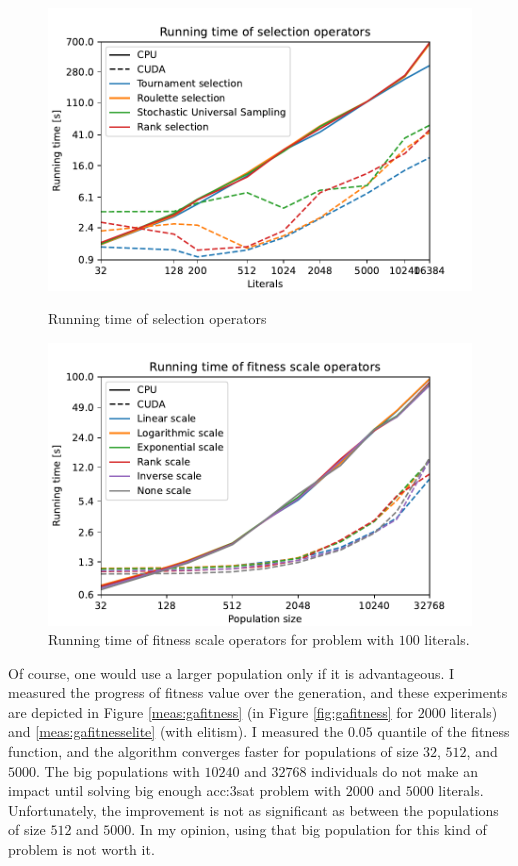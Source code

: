 \begin{figure}
    \begin{minipage}[t]{0.48\textwidth}
        \includegraphics[width=\textwidth]{img/runs/time_ga_selections_with_legend.pdf}
        \caption{Running time of selection operators}
        \label{fig:selectiontime}
    \end{minipage}
    \hfill
    \begin{minipage}[t]{0.48\textwidth}
        \includegraphics[width=\textwidth]{img/runs/time_ga_scale_100l_with_legend.pdf}
        \caption[Running time of fitness scale operators]{Running time of fitness scale operators for problem with $100$ literals.}
        \label{fig:gafitnessscaletime}
    \end{minipage}
\end{figure}


Of course, one would use a larger population only if it is advantageous. I measured the progress of fitness value over the generation, and these experiments are depicted in Figure \ref{meas:gafitness} (in Figure \ref{fig:gafitness} for $2000$ literals) and \ref{meas:gafitnesselite} (with elitism). I measured the $0.05$ quantile of the fitness function, and the algorithm converges faster for populations of size $32$, $512$, and $5000$. The big populations with $10240$ and $32768$ individuals do not make an impact until solving big enough \acrshort{acc:3sat} problem with $2000$ and $5000$ literals. Unfortunately, the improvement is not as significant as between the populations of size $512$ and $5000$. In my opinion, using that big population for this kind of problem is not worth it.

